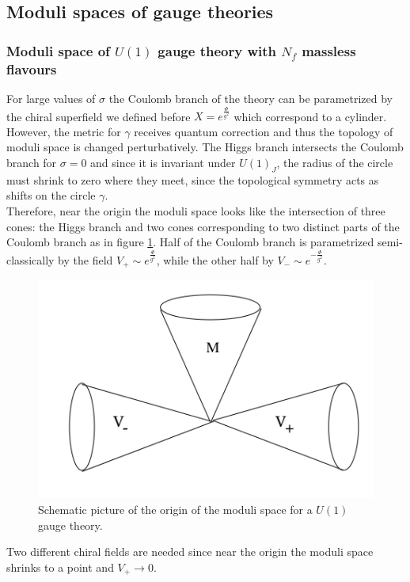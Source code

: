  \subsection{Moduli spaces of gauge theories}

\subsubsection{Moduli space of $U(1)$ gauge theory with $N_f$ massless flavours }
For large values of $\sigma$ the Coulomb branch of the theory can be parametrized by the chiral superfield we defined before $X = e^{\frac{\Phi}{g^2}} $ which correspond to a cylinder.
However, the metric for $\gamma$ receives quantum correction and thus the topology of moduli space is changed perturbatively.
The Higgs branch intersects the Coulomb branch for $\sigma=0$ and since it is invariant under $U(1)_J$, the radius of the circle must shrink to zero where they meet, since the topological symmetry acts as shifts on the circle $\gamma$.
\\
Therefore, near the origin the moduli space looks like the intersection of three cones: the Higgs branch and two cones corresponding to two distinct parts of the Coulomb branch as in figure \ref{fig:u1_origin_cones}.
Half of the Coulomb branch is parametrized semi-classically by the field $V_+ \sim e^{\frac{\Phi}{g^2}}$, while the other half by $V_- \sim e^{ -\frac{\Phi}{g^2} }$. 
\begin{figure}[ht]
\centering
\includegraphics[scale=0.38]{u1_threecones.png}
\caption{Schematic picture of the origin of the moduli space for a $U(1)$ gauge theory.}
\label{fig:u1_origin_cones}
\end{figure}	
Two different chiral fields are needed since near the origin the moduli space shrinks to a point and $V_+ \rightarrow 0$. 
